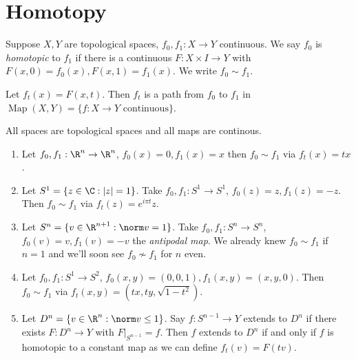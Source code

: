 \documentclass[a4paper]{article}
\DeclareMathOperator{\Map}{Map} %
\begin{document}


\tableofcontents

\setcounter{section}{-1}

\section{Homotopy}

\begin{definition}[homotopy]
  Suppose \(X, Y\) are topological spaces, \(f_0, f_1: X \to Y\) continuous. We say \(f_0\) is \emph{homotopic} to \(f_1\) if there is a continuous \(F: X \times I \to Y\) with \(F(x, 0) = f_0(x), F(x, 1) = f_1(x)\). We write \(f_0 \sim f_1\).
\end{definition}

Let \(f_t(x) = F(x, t)\). Then \(f_t\) is a path from \(f_0\) to \(f_1\) in \(\Map(X, Y) = \{f: X \to Y \text{ continuous}\}\).

\begin{convention}
  All spaces are topological spaces and all maps are continous.
\end{convention}

\begin{eg}\leavevmode
  \begin{enumerate}
  \item Let \(f_0, f_1: \R^n \to \R^n\), \(f_0(x) = 0, f_1(x) = x\) then \(f_0 \sim f_1\) via \(f_t(x) = tx\).
  \item Let \(S^1 = \{z \in \C: |z| = 1\}\). Take \(f_0, f_1: S^1 \to S^1\), \(f_0(z) = z, f_1(z) = -z\). Then \(f_0 \sim f_1\) via \(f_t(z) = e^{i\pi t}z\).
  \item Let \(S^n = \{v \in \R^{n + 1}: \norm v = 1\}\). Take \(f_0, f_1: S^n \to S^n\), \(f_0(v) = v, f_1(v) = -v\) the \emph{antipodal map}. We already knew \(f_0 \sim f_1\) if \(n = 1\) and we'll soon see \(f_0 \nsim f_1\) for \(n\) even.
  \item Let \(f_0, f_1: S^1 \to S^2\), \(f_0(x, y) = (0, 0, 1), f_1(x, y) = (x, y, 0)\). Then \(f_0 \sim f_1\) via \(f_t(x, y) = (tx, ty, \sqrt{1 - t^2})\).
  \item Let \(D^n = \{v \in \R^n: \norm v \leq 1\}\). Say \(f: S^{n - 1} \to Y\) extends to \(D^n\) if there exists \(F: D^n \to Y\) with \(F|_{S^{n - 1}} = f\). Then \(f\) extends to \(D^n\) if and only if \(f\) is homotopic to a constant map as we can define \(f_t(v) = F(tv)\).
  \end{enumerate}
\end{eg}
\end{document}
